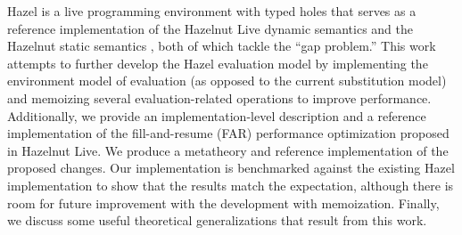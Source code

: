 
\noindent{}Hazel is a live programming environment with typed holes that serves as a reference implementation of the Hazelnut Live dynamic semantics \cite{conf/popl/Hazelnut17} and the Hazelnut static semantics \cite{conf/popl/HazelnutLive19}, both of which tackle the ``gap problem.'' This work attempts to further develop the Hazel evaluation model by implementing the environment model of evaluation (as opposed to the current substitution model) and memoizing several evaluation-related operations to improve performance. Additionally, we provide an implementation-level description and a reference implementation of the fill-and-resume (FAR) performance optimization proposed in Hazelnut Live. We produce a metatheory and reference implementation of the proposed changes. Our implementation is benchmarked against the existing Hazel implementation to show that the results match the expectation, although there is room for future improvement with the development with memoization. Finally, we discuss some useful theoretical generalizations that result from this work.

